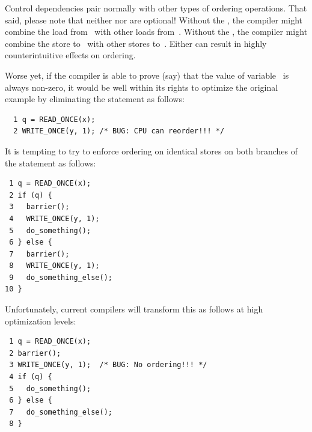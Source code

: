 Control dependencies pair normally with other types of ordering operations.
That said, please note that neither  nor 
are optional!
Without the , the compiler might combine the load
from~ with other loads from~.
Without the , the compiler might combine the store
to~ with other stores to~.
Either can result in highly counterintuitive effects on ordering.

Worse yet, if the compiler is able to prove (say) that the value of
variable~ is always non-zero, it would be well within its rights
to optimize the original example by eliminating the  statement
as follows:

\vspace{5pt}
\begin{minipage}[t]{\columnwidth}
\scriptsize
\begin{verbatim}
  1 q = READ_ONCE(x);
  2 WRITE_ONCE(y, 1); /* BUG: CPU can reorder!!! */
\end{verbatim}
\end{minipage}
\vspace{5pt}

It is tempting to try to enforce ordering on identical stores on both
branches of the  statement as follows:

\vspace{5pt}
\begin{minipage}[t]{\columnwidth}
\scriptsize
\begin{verbatim}
 1 q = READ_ONCE(x);
 2 if (q) {
 3   barrier();
 4   WRITE_ONCE(y, 1);
 5   do_something();
 6 } else {
 7   barrier();
 8   WRITE_ONCE(y, 1);
 9   do_something_else();
10 }
\end{verbatim}
\end{minipage}
\vspace{5pt}

Unfortunately, current compilers will transform this as follows at high
optimization levels:

\vspace{5pt}
\begin{minipage}[t]{\columnwidth}
\scriptsize
\begin{verbatim}
 1 q = READ_ONCE(x);
 2 barrier();
 3 WRITE_ONCE(y, 1);  /* BUG: No ordering!!! */
 4 if (q) {
 5   do_something();
 6 } else {
 7   do_something_else();
 8 }
\end{verbatim}
\end{minipage}
\vspace{5pt}

